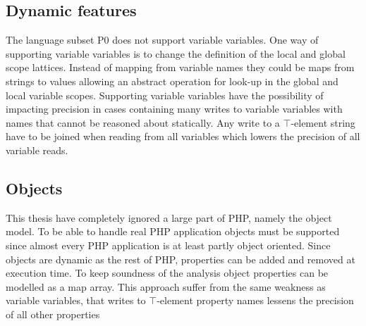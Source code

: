 \subsection{Dynamic features}
The language subset P0 does not support variable variables. One way of supporting variable variables is to change the definition of the local and global scope lattices. Instead of mapping from variable names they could be maps from strings to values allowing an abstract operation for look-up in the global and local variable scopes. Supporting variable variables have the possibility of impacting precision in cases containing many writes to variable variables with names that cannot be reasoned about statically. Any write to a $\top$-element string have to be joined when reading from all variables which lowers the precision of all variable reads.


\subsection{Objects}
This thesis have completely ignored a large part of PHP, namely the object model. To be able to handle real PHP application objects must be supported since almost every PHP application is at least partly object oriented. Since objects are dynamic as the rest of PHP, properties can be added and removed at execution time. To keep soundness of the analysis object properties can be modelled as a map array. This approach suffer from the same weakness as variable variables, that writes to $\top$-element property names lessens the precision of all other properties